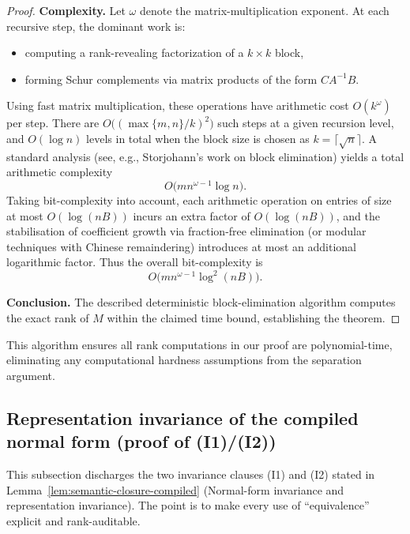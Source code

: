 \documentclass[12pt]{article}
\theoremstyle{definition}
\theoremstyle{definition}
\theoremstyle{remark}
\theoremstyle{remark}
\begin{document}
\begin{proof}
\medskip
\noindent\textbf{Complexity.}
Let $\omega$ denote the matrix-multiplication exponent.  At each
recursive step, the dominant work is:
\begin{itemize}
  \item computing a rank-revealing factorization of a $k\times k$ block,
  \item forming Schur complements via matrix products of the form
        $C A^{-1} B$.
\end{itemize}
Using fast matrix multiplication, these operations have arithmetic cost
$O(k^{\omega})$ per step.
There are $O\big((\max\{m,n\}/k)^2\big)$ such steps at a given recursion
level, and $O(\log n)$ levels in total when the block size is chosen
as $k = \lceil \sqrt{n}\rceil$.
A standard analysis (see, e.g., Storjohann's work on block elimination)
yields a total arithmetic complexity
\[
  O\big(m n^{\omega-1} \log n\big).
\]
Taking bit-complexity into account, each arithmetic operation on entries
of size at most $O(\log(nB))$ incurs an extra factor of $O(\log(nB))$,
and the stabilisation of coefficient growth via fraction-free elimination
(or modular techniques with Chinese remaindering) introduces at most an
additional logarithmic factor.  Thus the overall bit-complexity is
\[
  O\big(m n^{\omega-1} \log^2(nB)\big).
\]

\medskip
\noindent\textbf{Conclusion.}
The described deterministic block-elimination algorithm computes the
exact rank of $M$ within the claimed time bound, establishing the
theorem.
\end{proof}

This algorithm ensures all rank computations in our proof are polynomial-time, eliminating any computational hardness assumptions from the separation argument.


\subsection{Representation invariance of the compiled normal form (proof of (I1)/(I2))}
\label{app:rep-invariance}

This subsection discharges the two invariance clauses (I1) and (I2) stated in
Lemma~\ref{lem:semantic-closure-compiled} (Normal-form invariance and representation invariance).
The point is to make every use of ``equivalence'' explicit and rank-auditable.
\end{document}
